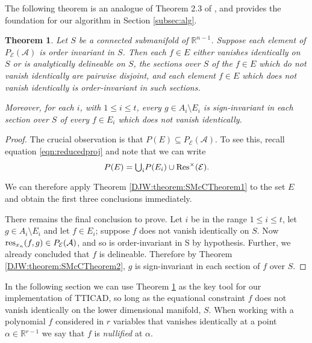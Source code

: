 \documentclass{article}
\def\R {\ensuremath{\mathbb{R}}}
\newtheorem{theorem}{Theorem}
\begin{document}
\noindent The following theorem is an analogue of Theorem 2.3 of \cite{McCallum1999a},
and provides the foundation for our algorithm in Section \ref{subsec:alg}.

\begin{theorem}\label{DJW:theorem:SMcC3corrected}
  Let $S$ be a connected submanifold of $\mathbb{R}^{n-1}$. Suppose each element of $P_{\mathcal{E}}(\mathcal{A})$ is order invariant in $S$. Then each $f \in E$ either vanishes identically on $S$ or is analytically delineable on $S$, the sections over $S$ of the $f \in E$ which do not vanish identically are pairwise disjoint, and each element $f \in E$ which does not vanish identically is order-invariant in such sections.
  
{\em Moreover}, for each $i$, with $1 \leq i \leq t$, every $g \in A_i \setminus E_i$ is sign-invariant in each section over $S$ of every $f \in E_i$ which does not vanish identically. 
\end{theorem}

\begin{proof}
The crucial observation is that 
$P(E) \subseteq P_{\mathcal{E}}(\mathcal{A}).
$ To see this, recall equation \eqref{eqn:reducedproj} and note that we can write
\begin{equation*}
  P(E) = {\textstyle\bigcup_i }P(E_i) \cup {\rm Res}^{\times}(\mathcal{E}).
\end{equation*}

We can therefore apply Theorem \ref{DJW:theorem:SMcCTheorem1} to the set $E$ and obtain the first three conclusions immediately.

There remains the final conclusion to prove. Let $i$ be in the range $1 \leq i \leq t$, let $g \in A_i \setminus E_i$ and let $f \in E_i$; suppose $f$ does not vanish identically on $S$. Now ${\rm res}_{x_n}(f,g) \in P_{\mathcal{E}}(\mathcal{A})$, and so is order-invariant in S by hypothesis. Further, we already concluded that $f$ is delineable. Therefore by Theorem \ref{DJW:theorem:SMcCTheorem2}, $g$ is sign-invariant in each section of $f$ over $S$. 
\end{proof}

In the following section we can use Theorem \ref{DJW:theorem:SMcC3corrected} as the key tool for our implementation of TTICAD, so long as the equational constraint $f$ does not vanish identically on the lower dimensional manifold, $S$.  When working with a polynomial $f$ considered in $r$ variables that vanishes identically at a point  $\alpha \in \R{}^{r-1}$ we say that $f$ is {\em nullified} at $\alpha$.
\end{document}
